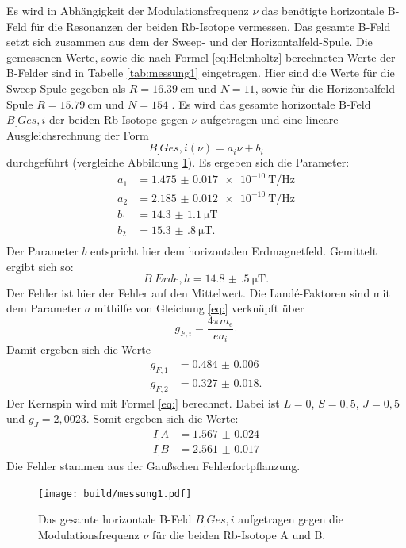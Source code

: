 Es wird in Abhängigkeit der Modulationsfrequenz $\nu$ das benötigte horizontale B-Feld für die Resonanzen der beiden Rb-Isotope vermessen. Das gesamte B-Feld setzt sich zusammen aus dem der Sweep- und der Horizontalfeld-Spule. Die gemessenen Werte, sowie die nach Formel \ref{eq:Helmholtz} berechneten Werte der B-Felder sind in Tabelle \ref{tab:messung1} eingetragen. Hier sind die Werte für die Sweep-Spule gegeben als $R=\SI{16.39}{\centi\metre}$ und $N=11$, sowie für die Horizontalfeld-Spule $R=\SI{15.79}{\centi\metre}$ und $N=154$ \cite{V21}.
Es wird das gesamte horizontale B-Feld $B_.{Ges,i}$ der beiden Rb-Isotope gegen $\nu$ aufgetragen und eine lineare Ausgleichsrechnung der Form
\[
B_.{Ges,i}(\nu) = a_i\nu + b_i
\]
durchgeführt (vergleiche Abbildung \ref{fig:messung1}).
Es ergeben sich die Parameter:
\begin{align*}
a_1 &= \SI{1.475(17)e-10}{\tesla\per\hertz}\\
a_2 &= \SI{2.185(12)e-10}{\tesla\per\hertz}\\
b_1 &= \SI{14.3(11)}{\micro\tesla}\\
b_2 &= \SI{15.3(8)}{\micro\tesla}\text{.}\\
\end{align*}
Der Parameter $b$ entspricht hier dem horizontalen Erdmagnetfeld. Gemittelt ergibt sich so:
\[
B_.{Erde,h} = \SI{14.8(5)}{\micro\tesla}\text{.}
\]
Der Fehler ist hier der Fehler auf den Mittelwert.
Die Landé-Faktoren sind mit dem Parameter $a$ mithilfe von Gleichung \eqref{eq:} verknüpft über
\begin{equation*}
g_{F,i}=\frac{4\pi m_e}{e a_i} \text{.}
\end{equation*}
Damit ergeben sich die Werte
\begin{align*}
g_{F,1} &= \num{0.484(6)}\\
g_{F,2} &= \num{0.327(18)}\text{.}
\end{align*}
Der Kernspin wird mit Formel \eqref{eq:} berechnet. Dabei ist $L=0$, $S=0,5$, $J=0,5$ und $g_J=2,0023$. 
Somit ergeben sich die Werte:
\begin{align*}
I_.A &= \num{1.567(24)}\\
I_.B &= \num{2.561(17)}
\end{align*}
Die Fehler stammen aus der Gaußschen Fehlerfortpflanzung.
\begin{figure}
	\centering
	\texttt{[image: build/messung1.pdf]}
	\caption{Das gesamte horizontale B-Feld $B_.{Ges,i}$ aufgetragen gegen die Modulationsfrequenz $\nu$ für die beiden Rb-Isotope A und B.}
	\label{fig:messung1}
\end{figure}

